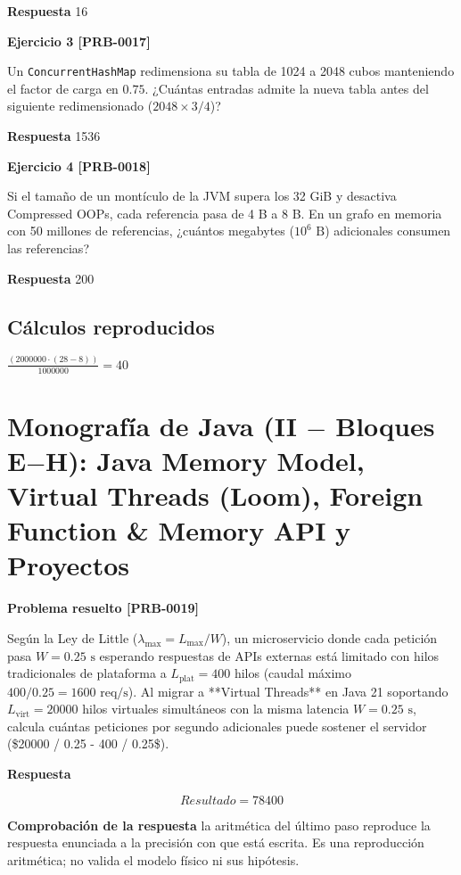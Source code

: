 \documentclass{book}
\begin{document}
\noindent\textbf{Respuesta} 16

\noindent\textbf{Ejercicio 3 [PRB-0017]}

Un \texttt{ConcurrentHashMap} redimensiona su tabla de 1024 a 2048 cubos manteniendo el factor de carga en \(0.75\). ¿Cuántas entradas admite la nueva tabla antes del siguiente redimensionado (\(2048 \times 3 / 4\))?

\noindent\textbf{Respuesta} 1536

\noindent\textbf{Ejercicio 4 [PRB-0018]}

Si el tamaño de un montículo de la JVM supera los 32 GiB y desactiva Compressed OOPs, cada referencia pasa de 4 B a 8 B. En un grafo en memoria con 50 millones de referencias, ¿cuántos megabytes (\(10^6\text{ B}\)) adicionales consumen las referencias?

\noindent\textbf{Respuesta} 200

\subsection*{Cálculos reproducidos}

\(\frac{\left(2000000\cdot \left(28-8\right)\right)}{1000000} = 40\)

\section{Monografía de Java (II \(-\) Bloques E\(-\)H): Java Memory Model, Virtual Threads (Loom), Foreign Function \& Memory API y Proyectos}

\noindent\textbf{Problema resuelto [PRB-0019]}

Según la Ley de Little (\(\lambda_{\max} = L_{\max} / W\)), un microservicio donde cada petición pasa \(W = 0.25\text{ s}\) esperando respuestas de APIs externas está limitado con hilos tradicionales de plataforma a \(L_{\text{plat}} = 400\) hilos (caudal máximo \(400 / 0.25 = 1600\text{ req/s}\)). Al migrar a **Virtual Threads** en Java 21 soportando \(L_{\text{virt}} = 20000\) hilos virtuales simultáneos con la misma latencia \(W = 0.25\text{ s}\), calcula cuántas peticiones por segundo adicionales puede sostener el servidor (\$20000 / 0.25 - 400 / 0.25\$).

\noindent\textbf{Respuesta}

\[
Resultado = 78400
\]

\noindent\textbf{Comprobación de la respuesta} la aritmética del último paso reproduce la respuesta enunciada a la precisión con que está escrita. Es una reproducción aritmética; no valida el modelo físico ni sus hipótesis.
\end{document}
